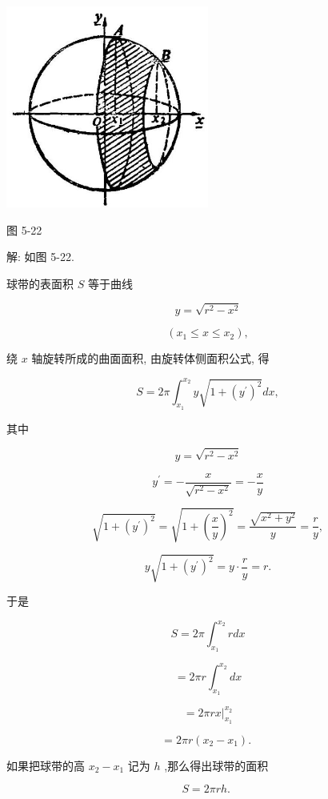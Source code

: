 \documentclass[lang=cn,newtx,10pt,scheme=chinese]{elegantbook}
\begin{document}
\begin{center}
\includegraphics[max width=0.5\textwidth]{images/01912c18-5c3f-733d-b775-749ba9897a9d_245_758349.jpg}
\end{center}

图 5-22

解: 如图 5-22.

球带的表面积 \(S\) 等于曲线

\[
y = \sqrt{{r}^{2} - {x}^{2}}
\]

\[
\left( {{x}_{1} \leq x \leq {x}_{2}}\right) ,
\]

绕 \(x\) 轴旋转所成的曲面面积, 由旋转体侧面积公式, 得

\[
S = {2\pi }{\int }_{{x}_{1}}^{{x}_{2}}y\sqrt{1 + {\left( {y}^{\prime }\right) }^{2}}{dx},
\]

其中

\[
y = \sqrt{{r}^{2} - {x}^{2}}
\]

\[
{y}^{\prime } = - \frac{x}{\sqrt{{r}^{2} - {x}^{2}}} = - \frac{x}{y}
\]

\[
\sqrt{1 + {\left( {y}^{\prime }\right) }^{2}} = \sqrt{1 + {\left( \frac{x}{y}\right) }^{2}} = \frac{\sqrt{{x}^{2} + {y}^{2}}}{y} = \frac{r}{y},
\]

\[
y\sqrt{1 + {\left( {y}^{\prime }\right) }^{2}} = y \cdot \frac{r}{y} = r.
\]

于是

\[
S = {2\pi }{\int }_{{x}_{1}}^{{x}_{2}}{rdx}
\]

\[
= {2\pi r}{\int }_{{x}_{1}}^{{x}_{2}}{dx}
\]

\[
= {\left. 2\pi rx\right| }_{{x}_{1}}^{{x}_{2}}
\]

\[
= {2\pi r}\left( {{x}_{2} - {x}_{1}}\right) \text{. }
\]

如果把球带的高 \({x}_{2} - {x}_{1}\) 记为 \(h\) ,那么得出球带的面积

\[
S = {2\pi rh}\text{. }
\]
\end{document}
